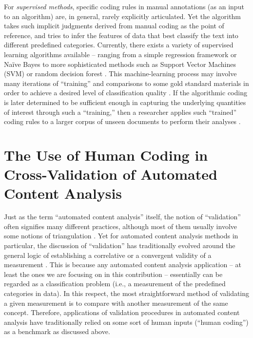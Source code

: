 \documentclass[man, 12pt, a4paper, nolmodern, noextraspace]{apa6}
\begin{document}
    For \textit{supervised methods}, specific coding rules in manual annotations (as an input to an algorithm) are, in general, rarely explicitly articulated. Yet the algorithm takes such implicit judgments derived from manual coding as the point of reference, and tries to infer the features of data that best classify the text into different predefined categories. Currently, there exists a variety of supervised learning algorithms available -- ranging from a simple regression framework or Naïve Bayes to more sophisticated methods such as Support Vector Machines (SVM) or random decision forest \parencites[for an overview, see][]{hindman2015building}. This machine-learning process may involve many iterations of \enquote{training} and comparisons to some gold standard materials in order to achieve a desired level of classification quality \parencites[e.g.,][]{scharkow2013thematic}. If the algorithmic coding is later determined to be sufficient enough in capturing the underlying quantities of interest through such a \enquote{training,} then a researcher applies such \enquote{trained} coding rules to a larger corpus of unseen documents to perform their analyses \parencites[e.g.,][]{burscher2015using, burscher2014teaching, scharkow2013thematic, gonzalez2015signals}.    
    
\section{The Use of Human Coding in Cross-Validation of Automated Content Analysis}
    
    Just as the term \enquote{automated content analysis} itself, the notion of \enquote{validation} often signifies many different practices, although most of them usually involve some notions of triangulation \parencites[e.g.,][]{Neunhoeffer2018}. Yet for automated content analysis methods in particular, the discussion of \enquote{validation} has traditionally evolved around the general logic of establishing a correlative or a convergent validity of a measurement \parencites[][]{Krippendorff2008validity}. This is because any automated content analysis application -- at least the ones we are focusing on in this contribution -- essentially can be regarded as a classification problem (i.e., a measurement of the predefined categories in data). In this respect, the most straightforward method of validating a given measurement is to compare with another measurement of the same concept. Therefore, applications of validation procedures in automated content analysis have traditionally relied on some sort of human inputs (“human coding”) as a benchmark as discussed above. 
    
\end{document}
